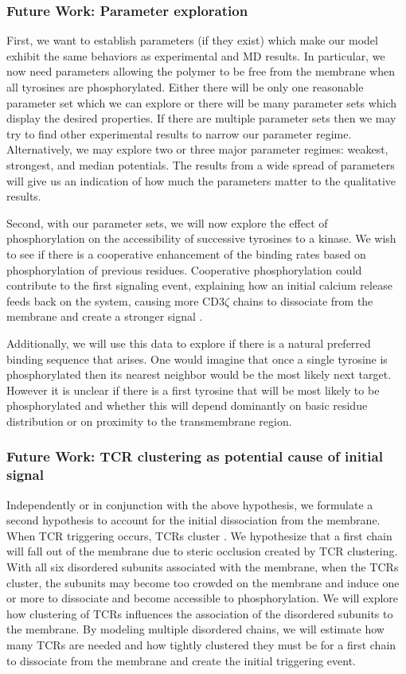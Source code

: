 \documentclass[../../AdvancementSummary.tex]{subfiles}
\begin{document}
\subsubsection{Future Work: Parameter exploration}

First, we want to establish parameters (if they exist) which make our model exhibit the same behaviors as experimental and MD results. In particular, we now need parameters allowing the polymer to be free from the membrane when all tyrosines are phosphorylated. Either there will be only one reasonable parameter set which we can explore or there will be many parameter sets which display the desired properties. If there are multiple parameter sets then we may try to find other experimental results to narrow our parameter regime. Alternatively, we may explore two or three major parameter regimes: weakest, strongest, and median potentials. The results from a wide spread of parameters will give us an indication of how much the parameters matter to the qualitative results. 

Second, with our parameter sets, we will now explore the effect of phosphorylation on the accessibility of successive tyrosines to a kinase. We wish to see if there is a cooperative enhancement of the binding rates based on phosphorylation of previous residues. Cooperative phosphorylation could contribute to the first signaling event, explaining how an initial calcium release feeds back on the system, causing more CD3$\zeta$ chains to dissociate from the membrane and create a stronger signal \cite{Shi2013}.

Additionally, we will use this data to explore if there is a natural preferred binding sequence that arises. One would imagine that once a single tyrosine is phosphorylated then its nearest neighbor would be the most likely next target. However it is unclear if there is a first tyrosine that will be most likely to be phosphorylated and whether this will depend dominantly on basic residue distribution or on proximity to the transmembrane region. 

\subsubsection{Future Work: TCR clustering as potential cause of initial signal}
Independently or in conjunction with the above hypothesis, we formulate a second hypothesis to account for the initial dissociation from the membrane. When TCR triggering occurs, TCRs cluster \cite{Monks1998, Bunnell2002}. We hypothesize that a first chain will fall out of the membrane due to steric occlusion created by TCR clustering. With all six disordered subunits associated with the membrane, when the TCRs cluster, the subunits may become too crowded on the membrane and induce one or more to dissociate and become accessible to phosphorylation. We will explore how clustering of TCRs influences the association of the disordered subunits to the membrane. By modeling multiple disordered chains, we will estimate how many TCRs are needed and how tightly clustered they must be for a first chain to dissociate from the membrane and create the initial triggering event.
\end{document}

